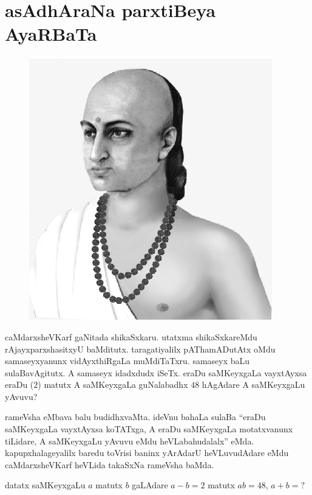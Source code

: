 \chapter{asAdhAraNa parxtiBeya AyaRBaTa}


\begin{figure}
  \centering\includegraphics[scale=0.8]{src/figures/aryabhata.eps}
    \end{figure}
    
caMdarxsheVKarf gaNitada shikaSxkaru. utatxma shikaSxkareMdu rAjayxparxshasitxyU baMditutx. taragatiyalilx pAThamADutAtx oMdu samaseyxyanunx vidAyxthiRgaLa muMdiTaTxru. samaseyx baLu sulaBavAgitutx. A samaseyx idadxdudx iSeTx. eraDu saMKeyxgaLa vayxtAyxsa eraDu ($2$) matutx A saMKeyxgaLa guNalabadhx $48$ hAgAdare A saMKeyxgaLu yAvuvu?

rameVsha eMbava balu budidhxvaMta. ideVnu bahaLa sulaBa ``eraDu saMKeyxgaLa vayxtAyxsa koTATxga, A eraDu saMKeyxgaLa motatxvanunx tiLidare, A saMKeyxgaLu yAvuvu eMdu heVLabahudalalx'' eMda. kapupxhalageyalilx baredu toVrisi baninx yArAdarU heVLuvudAdare eMdu caMdarxsheVKarf heVLida takaSxNa rameVsha baMda.

datatx saMKeyxgaLu $a$ matutx $b$ gaLAdare $a-b=2$ matutx $ab = 48$, $a+b=?$

